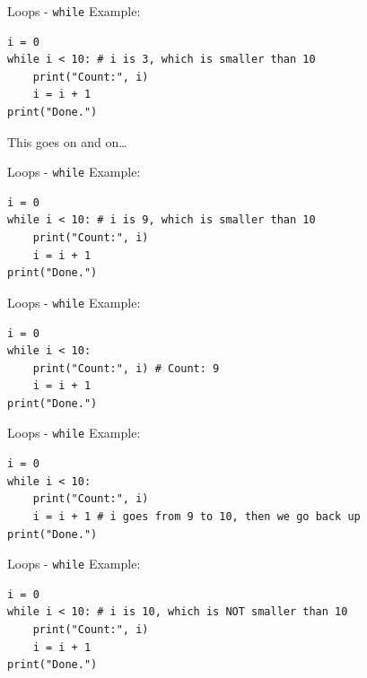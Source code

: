 \documentclass[dvipsnames, svgnames, x11names]{beamer}
\begin{document}
\addtocounter{framenumber}{-1}

\begin{frame}[fragile]{Loops - \texttt{while}}
Example:
\begin{verbatim}
i = 0
while i < 10: # i is 3, which is smaller than 10
    print("Count:", i)
    i = i + 1
print("Done.")
\end{verbatim}

This goes on and on\dots
\end{frame}

\addtocounter{framenumber}{-1}

\begin{frame}[fragile]{Loops - \texttt{while}}
Example:
\begin{verbatim}
i = 0
while i < 10: # i is 9, which is smaller than 10
    print("Count:", i)
    i = i + 1
print("Done.")
\end{verbatim}
\end{frame}

\addtocounter{framenumber}{-1}

\begin{frame}[fragile]{Loops - \texttt{while}}
Example:
\begin{verbatim}
i = 0
while i < 10: 
    print("Count:", i) # Count: 9
    i = i + 1
print("Done.")
\end{verbatim}
\end{frame}

\addtocounter{framenumber}{-1}

\begin{frame}[fragile]{Loops - \texttt{while}}
Example:
\begin{verbatim}
i = 0
while i < 10: 
    print("Count:", i)
    i = i + 1 # i goes from 9 to 10, then we go back up
print("Done.")
\end{verbatim}
\end{frame}

\addtocounter{framenumber}{-1}

\begin{frame}[fragile]{Loops - \texttt{while}}
Example:
\begin{verbatim}
i = 0
while i < 10: # i is 10, which is NOT smaller than 10
    print("Count:", i)
    i = i + 1
print("Done.")
\end{verbatim}
\end{frame}
\end{document}
